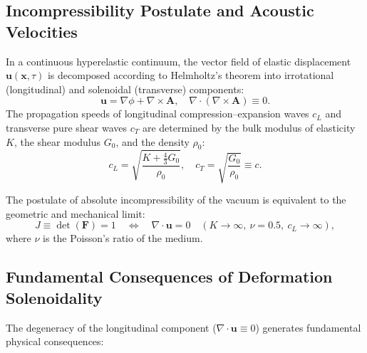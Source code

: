 \documentclass[12pt,a4paper]{article}
\begin{document}
	\subsection{Incompressibility Postulate and Acoustic Velocities}
	In a continuous hyperelastic continuum, the vector field of elastic displacement $\mathbf{u}(\mathbf{x}, \tau)$ is decomposed according to Helmholtz's theorem into irrotational (longitudinal) and solenoidal (transverse) components:
	\begin{equation}
		\mathbf{u} = \nabla \phi + \nabla \times \mathbf{A}, \quad \nabla \cdot (\nabla \times \mathbf{A}) \equiv 0.
	\end{equation}
	The propagation speeds of longitudinal compression--expansion waves $c_L$ and transverse pure shear waves $c_T$ are determined by the bulk modulus of elasticity $K$, the shear modulus $G_0$, and the density $\rho_0$:
	\begin{equation}
		c_L = \sqrt{\frac{K + \frac{4}{3}G_0}{\rho_0}}, \quad c_T = \sqrt{\frac{G_0}{\rho_0}} \equiv c.
	\end{equation}
	
	The postulate of absolute incompressibility of the vacuum is equivalent to the geometric and mechanical limit:
	\begin{equation}
		J \equiv \det(\mathbf{F}) = 1 \quad \Longleftrightarrow \quad \nabla \cdot \mathbf{u} = 0 \quad (K \to \infty, \ \nu = 0.5, \ c_L \to \infty),
	\end{equation}
	where $\nu$ is the Poisson's ratio of the medium.
	
	\subsection{Fundamental Consequences of Deformation Solenoidality}
	The degeneracy of the longitudinal component ($\nabla \cdot \mathbf{u} \equiv 0$) generates fundamental physical consequences:
	
\end{document}
